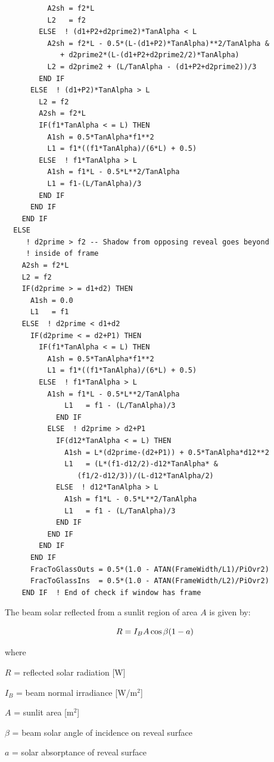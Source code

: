 \begin{lstlisting}
          A2sh = f2*L
          L2   = f2
        ELSE  ! (d1+P2+d2prime2)*TanAlpha < L
          A2sh = f2*L - 0.5*(L-(d1+P2)*TanAlpha)**2/TanAlpha &
             + d2prime2*(L-(d1+P2+d2prime2/2)*TanAlpha)
          L2 = d2prime2 + (L/TanAlpha - (d1+P2+d2prime2))/3
        END IF
      ELSE  ! (d1+P2)*TanAlpha > L
        L2 = f2
        A2sh = f2*L
        IF(f1*TanAlpha < = L) THEN
          A1sh = 0.5*TanAlpha*f1**2
          L1 = f1*((f1*TanAlpha)/(6*L) + 0.5)
        ELSE  ! f1*TanAlpha > L
          A1sh = f1*L - 0.5*L**2/TanAlpha
          L1 = f1-(L/TanAlpha)/3
        END IF
      END IF
    END IF
  ELSE
     ! d2prime > f2 -- Shadow from opposing reveal goes beyond
     ! inside of frame
    A2sh = f2*L
    L2 = f2
    IF(d2prime > = d1+d2) THEN
      A1sh = 0.0
      L1   = f1
    ELSE  ! d2prime < d1+d2
      IF(d2prime < = d2+P1) THEN
        IF(f1*TanAlpha < = L) THEN
          A1sh = 0.5*TanAlpha*f1**2
          L1 = f1*((f1*TanAlpha)/(6*L) + 0.5)
        ELSE  ! f1*TanAlpha > L
          A1sh = f1*L - 0.5*L**2/TanAlpha
              L1   = f1 - (L/TanAlpha)/3
            END IF
          ELSE  ! d2prime > d2+P1
            IF(d12*TanAlpha < = L) THEN
              A1sh = L*(d2prime-(d2+P1)) + 0.5*TanAlpha*d12**2
              L1   = (L*(f1-d12/2)-d12*TanAlpha* &
                 (f1/2-d12/3))/(L-d12*TanAlpha/2)
            ELSE  ! d12*TanAlpha > L
              A1sh = f1*L - 0.5*L**2/TanAlpha
              L1   = f1 - (L/TanAlpha)/3
            END IF
          END IF
        END IF
      END IF
      FracToGlassOuts = 0.5*(1.0 - ATAN(FrameWidth/L1)/PiOvr2)
      FracToGlassIns  = 0.5*(1.0 - ATAN(FrameWidth/L2)/PiOvr2)
    END IF  ! End of check if window has frame
\end{lstlisting}

The beam solar reflected from a sunlit region of area \(A\) is given by:

\begin{equation}
R = {I_B}A\cos \beta (1 - a){\rm{ }}
\end{equation}

where

\(R\) = reflected solar radiation {[}W{]}

\({I_B}\) = beam normal irradiance {[}W/m\(^{2}\){]}

\(A\) = sunlit area {[}m\(^{2}\){]}

\(\beta\) = beam solar angle of incidence on reveal surface

\(a\) = solar absorptance of reveal surface

